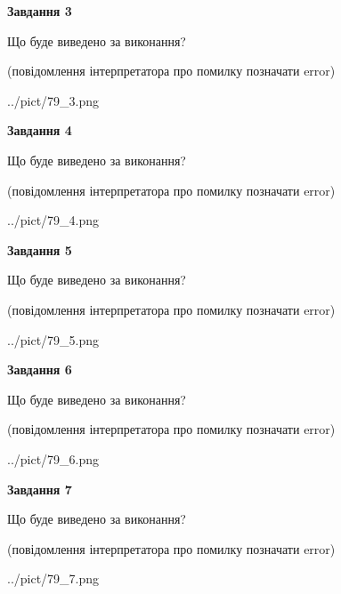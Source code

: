\documentclass[12pt, ukrainian]{article}
\begin{document}
{\begin {large}
{\begin {center}\textbf{Завдання 3}\end {center}}\par
Що буде виведено за виконання?\par
 (повідомлення інтерпретатора про помилку позначати error)\par
\begin{center}
	{../pict/79_3.png}
\end{center}
\newpage

{\begin {center}\textbf{Завдання 4}\end {center}}\par
Що буде виведено за виконання?\par
 (повідомлення інтерпретатора про помилку позначати error)\par
\begin{center}
	{../pict/79_4.png}
\end{center}
\newpage

{\begin {center}\textbf{Завдання 5}\end {center}}\par
Що буде виведено за виконання?\par
 (повідомлення інтерпретатора про помилку позначати error)\par
\begin{center}
	{../pict/79_5.png}
\end{center}
\newpage

{\begin {center}\textbf{Завдання 6}\end {center}}\par
Що буде виведено за виконання?\par
 (повідомлення інтерпретатора про помилку позначати error)\par
\begin{center}
	{../pict/79_6.png}
\end{center}
\newpage

{\begin {center}\textbf{Завдання 7}\end {center}}\par
Що буде виведено за виконання?\par
 (повідомлення інтерпретатора про помилку позначати error)\par
\begin{center}
	{../pict/79_7.png}
\end{center}
\newpage


\end{large}}
\end{document}
